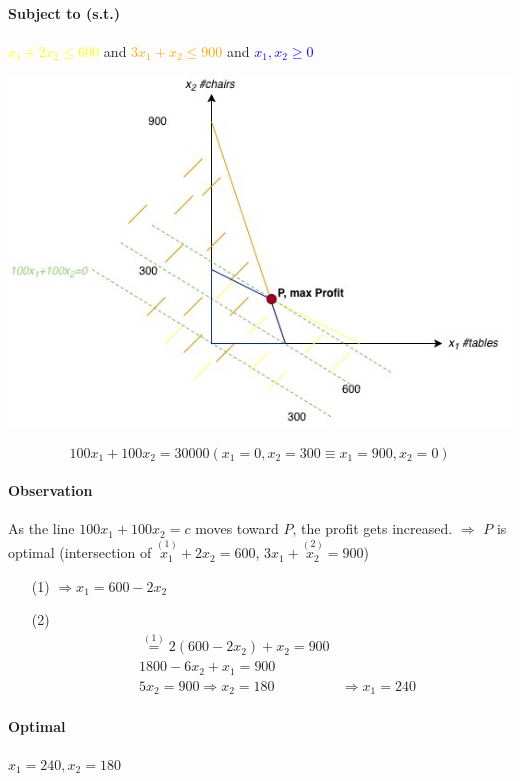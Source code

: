 \paragraph{Subject to (s.t.)} \textcolor{yellow}{$x_1 + 2x_2 \leq 600$} and \textcolor{orange}{$3x_1+x_2 \leq 900$} and \textcolor{blue}{$x_1,x_2 \geq 0$} \\
\begin{center}
	\includegraphics[scale=0.75]{img/dia1}
\end{center}
$$100x_1+100x_2 = 30000 (x_1=0,x_2 = 300 \equiv x_1 = 900, x_2=0)$$
\paragraph{Observation} As the line $100x_1+100x_2=c$ moves toward $P$, the profit gets increased. $\Rightarrow$ $P$ is optimal (intersection of $\stackrel{(1)}{x_1}+2x_2=600$, $3x_1+\stackrel{(2)}{x_2} = 900$) \\
\begin{itemize}
	\item[(1)] $\Rightarrow x_1 = 600 - 2x_2$
	\item[(2)] \begin{align*} &\stackrel{(1)}{=}2(600-2x_2)+x_2 = 900 \\
	& 1800 - 6x_2+x_1 = 900 \\
	&5x_2 = 900 \Rightarrow x_2 = 180
	& \Rightarrow x_1 = 240
	\end{align*}
\end{itemize}
\paragraph{Optimal} $x_1 = 240, x_2 = 180$
